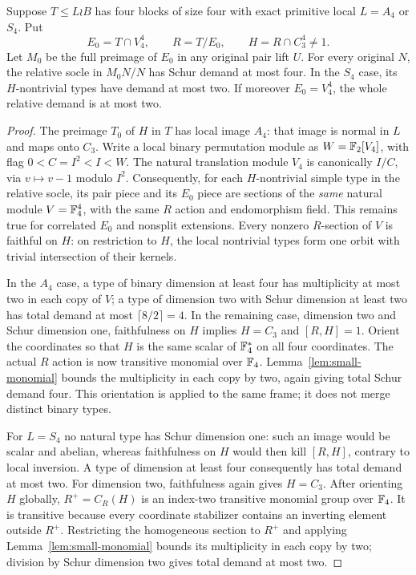 \begin{lemma}
\label{lem:four-point-relative}
Suppose $T\leq L\wr B$ has four blocks of size four with exact
primitive local $L=A_4$ or $S_4$. Put
\[
 E_0=T\cap V_4^4,\qquad R=T/E_0,\qquad H=R\cap C_3^4\ne1.
\]
Let $M_0$ be the full preimage of $E_0$ in any original pair lift $U$.
For every original $N$, the relative socle in $M_0N/N$ has Schur
demand at most four. In the $S_4$ case, its $H$-nontrivial types
have demand at most two. If moreover $E_0=V_4^4$, the whole relative
demand is at most two.
\end{lemma}
\begin{proof}
The preimage $T_0$ of $H$ in $T$ has local image $A_4$: that image
is normal in $L$ and maps onto $C_3$. Write a local binary
permutation module as $W=\mathbb F_2[V_4]$, with flag
$0<C=I^2<I<W$. The natural translation module $V_4$ is canonically
$I/C$, via $v\mapsto v-1$ modulo $I^2$. Consequently, for each
$H$-nontrivial simple type in the relative socle, its pair piece
and its $E_0$ piece are sections of the \emph{same} natural module
$V=\mathbb F_4^4$, with the same $R$ action and endomorphism field.
This remains true for correlated $E_0$ and nonsplit extensions.
Every nonzero $R$-section of $V$ is faithful on $H$: on restriction
to $H$, the local nontrivial types form one orbit with trivial
intersection of their kernels.

In the $A_4$ case, a type of binary dimension at least four has
multiplicity at most two in each copy of $V$; a type of dimension
two with Schur dimension at least two has total demand at most
$\lceil8/2\rceil=4$. In the remaining case, dimension two and
Schur dimension one, faithfulness on $H$ implies $H=C_3$ and
$[R,H]=1$. Orient the coordinates so that $H$ is the same scalar
of $\mathbb F_4^*$ on all four coordinates. The actual $R$ action is now
transitive monomial over $\mathbb F_4$. Lemma~\ref{lem:small-monomial}
bounds the multiplicity in each copy by two, again giving total
Schur demand four. This orientation is applied to the same frame;
it does not merge distinct binary types.

For $L=S_4$ no natural type has Schur dimension one: such an image
would be scalar and abelian, whereas faithfulness on $H$ would then
kill $[R,H]$, contrary to local inversion. A type of dimension at
least four consequently has total demand at most two. For dimension
two, faithfulness again gives $H=C_3$. After orienting $H$ globally,
$R^+=C_R(H)$ is an index-two transitive monomial group over $\mathbb F_4$.
It is transitive because every coordinate stabilizer contains an
inverting element outside $R^+$. Restricting the homogeneous section
to $R^+$ and applying Lemma~\ref{lem:small-monomial} bounds its
multiplicity in each copy by two; division by Schur dimension two
gives total demand at most two.


\end{proof}
